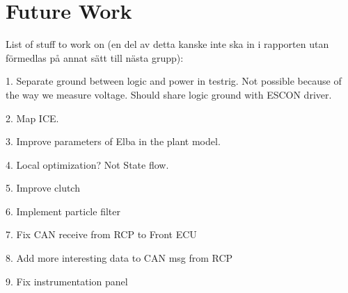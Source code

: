 \chapter{Future Work}

List of stuff to work on (en del av detta kanske inte ska in i rapporten utan förmedlas på annat sätt till nästa grupp):

1. Separate ground between logic and power in testrig. Not possible because of the way we measure voltage. Should share logic ground with ESCON driver.

2. Map ICE.

3. Improve parameters of Elba in the plant model.

4. Local optimization? Not State flow.

5. Improve clutch

6. Implement particle filter

7. Fix CAN receive from RCP to Front ECU

8. Add more interesting data to CAN msg from RCP

9. Fix instrumentation panel
